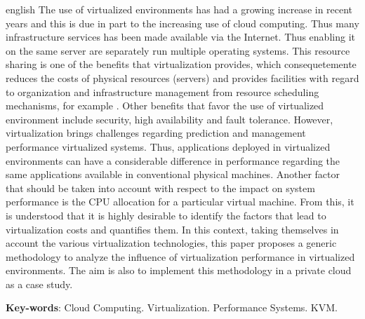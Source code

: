 \begin{resumo}[Abstract]
 \begin{otherlanguage*}{english}
The use of virtualized environments has had a growing increase in recent years and this is due in part to the increasing use of cloud computing. Thus many infrastructure services has been made available via the Internet. Thus enabling it on the same server are separately run multiple operating systems. This resource sharing is one of the benefits that virtualization provides, which consequetemente reduces the costs of physical resources (servers) and provides facilities with regard to organization and infrastructure management from resource scheduling mechanisms, for example . Other benefits that favor the use of virtualized environment include security, high availability and fault tolerance. However, virtualization brings challenges regarding prediction and management performance virtualized systems. Thus, applications deployed in virtualized environments can have a considerable difference in performance regarding the same applications available in conventional physical machines. Another factor that should be taken into account with respect to the impact on system performance is the CPU allocation for a particular virtual machine. From this, it is understood that it is highly desirable to identify the factors that lead to virtualization costs and quantifies them. In this context, taking themselves in account the various virtualization technologies, this paper proposes a generic methodology to analyze the influence of virtualization performance in virtualized environments. The aim is also to implement this methodology in a private cloud as a case study.
   \vspace{\onelineskip}
 
   \noindent 
   \textbf{Key-words}: Cloud Computing. Virtualization. Performance Systems. KVM.
 \end{otherlanguage*}
\end{resumo}
